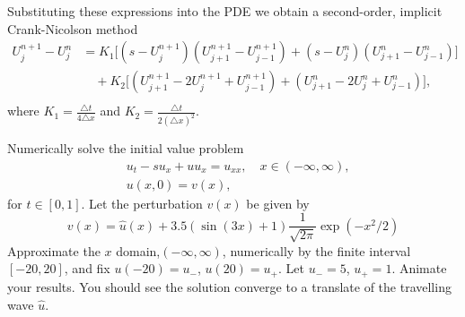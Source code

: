 Substituting these expressions into the PDE we obtain a second-order, implicit Crank-Nicolson method
\begin{align*}
U_j^{n+1} - U_j^n &= K_1 \big[(s - U_j^{n+1})(U_{j+1}^{n+1} - U_{j-1}^{n+1})
+ (s - U_j^n) (U_{j+1}^n - U_{j-1}^n) \big] \\
&{ }  \quad
+ K_2 \big[(U_{j+1}^{n+1} - 2U_j^{n+1}+ U_{j-1}^{n+1}) + (U_{j+1}^n -2U_j^n + U_{j-1}^n) \big],\\
&{ }  \quad
\end{align*}
where $K_1 = \frac{ \triangle t }{4 \triangle x}$ and $K_2 = \frac{ \triangle t}{2(\triangle x)^2}$.

\begin{problem}
Numerically solve the initial value problem
\begin{align*}
	&{ } u_t -su_x + uu_x = u_{xx}, \quad x \in (-\infty,\infty),\\
	&{ } u(x,0) = v(x),
\end{align*}
for $t \in [0,1]$.
Let the perturbation $v(x)$ be given by
\[v(x) = \hat{u}(x) + 3.5(\sin{(3x)} + 1)\frac{1}{\sqrt{2\pi}} \exp{(-x^2/2)}\]
Approximate the $x$ domain,$(-\infty, \infty)$, numerically by the finite interval $[-20,20]$, and fix $u(-20) = u_-$, $u(20) = u_+$. Let $u_- = 5$, $u_+ = 1$.
Animate your results.
You should see the solution converge to a translate of the travelling wave $\hat{u}$.
\end{problem}